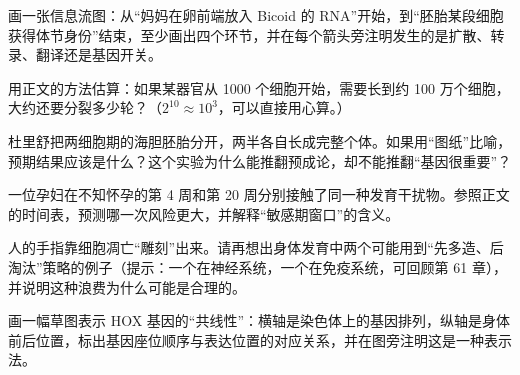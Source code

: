 \begin{sikaoti}
\item 画一张信息流图：从“妈妈在卵前端放入 Bicoid 的 RNA”开始，到“胚胎某段细胞获得体节身份”结束，至少画出四个环节，并在每个箭头旁注明发生的是扩散、转录、翻译还是基因开关。
\item 用正文的方法估算：如果某器官从 1000 个细胞开始，需要长到约 100 万个细胞，大约还要分裂多少轮？（$2^{10} \approx 10^{3}$，可以直接用心算。）
\item 杜里舒把两细胞期的海胆胚胎分开，两半各自长成完整个体。如果用“图纸”比喻，预期结果应该是什么？这个实验为什么能推翻预成论，却不能推翻“基因很重要”？
\item 一位孕妇在不知怀孕的第 4 周和第 20 周分别接触了同一种发育干扰物。参照正文的时间表，预测哪一次风险更大，并解释“敏感期窗口”的含义。
\item 人的手指靠细胞凋亡“雕刻”出来。请再想出身体发育中两个可能用到“先多造、后淘汰”策略的例子（提示：一个在神经系统，一个在免疫系统，可回顾第 61 章），并说明这种浪费为什么可能是合理的。
\item 画一幅草图表示 HOX 基因的“共线性”：横轴是染色体上的基因排列，纵轴是身体前后位置，标出基因座位顺序与表达位置的对应关系，并在图旁注明这是一种表示法。
\end{sikaoti}
